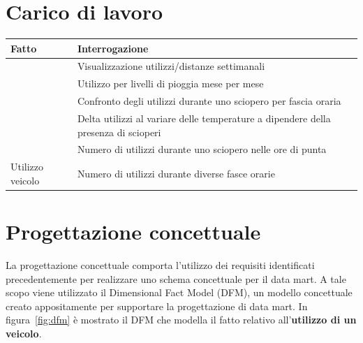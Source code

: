 \section{Carico di lavoro}
\begin{table}[h]
\centering
\begin{tabular}{|l|l|}
\hline
\rowcolor[HTML]{3166FF} 
{\color[HTML]{FFFFFF} \textbf{Fatto}} & {\color[HTML]{FFFFFF} \textbf{Interrogazione}}                                  \\ \hline
                                      & Visualizzazione utilizzi/distanze settimanali                     \\ \cline{2-2} 
                                      & Utilizzo per livelli di pioggia mese per mese                              \\ \cline{2-2} 
                                      & Confronto degli utilizzi durante uno sciopero per fascia oraria                      \\ \cline{2-2}  
                                      & Delta utilizzi al variare delle temperature a dipendere della presenza di scioperi \\ \cline{2-2} 
                                      & Numero di utilizzi durante uno sciopero nelle ore di punta         \\ \cline{2-2} 
\multirow{-7}{*}{Utilizzo veicolo}    & Numero di utilizzi durante diverse fasce orarie      \\ \hline
\end{tabular}
\end{table}
\section{Progettazione concettuale}
La progettazione concettuale comporta l’utilizzo dei requisiti identificati precedentemente 
per realizzare uno schema concettuale per il data mart. A tale scopo viene utilizzato il
Dimensional Fact Model (DFM), un modello concettuale creato appositamente per supportare
la progettazione di data mart. 
In figura~\ref{fig:dfm} è mostrato il DFM che modella il fatto relativo
all'\textbf{utilizzo di un veicolo}.

